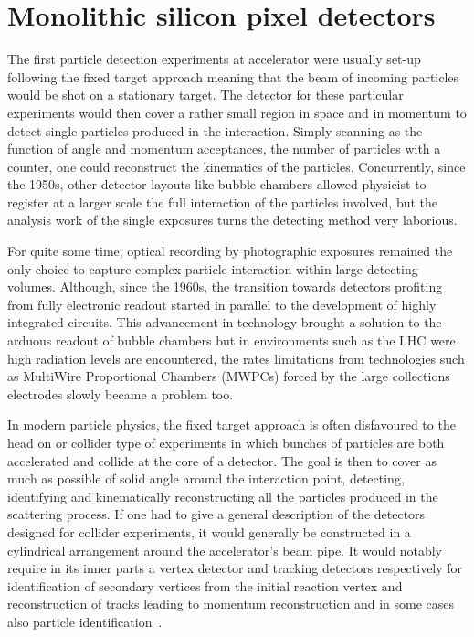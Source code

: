 \chapter{Monolithic silicon pixel detectors}\label{ch:2}

The first particle detection experiments at accelerator were usually set-up following the fixed target approach meaning that the beam of incoming particles would be shot on a stationary target. The detector for these particular experiments would then cover a rather small region in space and in momentum to detect single particles produced in the interaction. Simply scanning as the function of angle and momentum acceptances, the number of particles with a counter, one could reconstruct the kinematics of the particles. Concurrently, since the 1950s, other detector layouts like bubble chambers allowed physicist to register at a larger scale the full interaction of the particles involved, but the analysis work of the single exposures turns the detecting method very laborious. 

For quite some time, optical recording by photographic exposures remained the only choice to capture complex particle interaction within large detecting volumes. Although, since the 1960s, the transition towards detectors profiting from fully electronic readout started in parallel to the development of highly integrated circuits. This advancement in technology brought a solution to the arduous readout of bubble chambers but in environments such as the LHC were high radiation levels are encountered, the rates limitations from technologies such as MultiWire Proportional Chambers (MWPCs) forced by the large collections electrodes slowly became a problem too. 

In modern particle physics, the fixed target approach is often disfavoured to the head on or collider type of experiments in which bunches of particles are both accelerated and collide at the core of a detector. The goal is then to cover as much as possible of solid angle around the interaction point, detecting, identifying and kinematically reconstructing all the particles produced in the scattering process. If one had to give a general description of the detectors designed for collider experiments, it would generally be constructed in a cylindrical arrangement around the accelerator's beam pipe. It would notably require in its inner parts a vertex detector and tracking detectors respectively for identification of secondary vertices from the initial reaction vertex and reconstruction of tracks leading to momentum reconstruction and in some cases also particle identification\ \cite{detectors}. 

